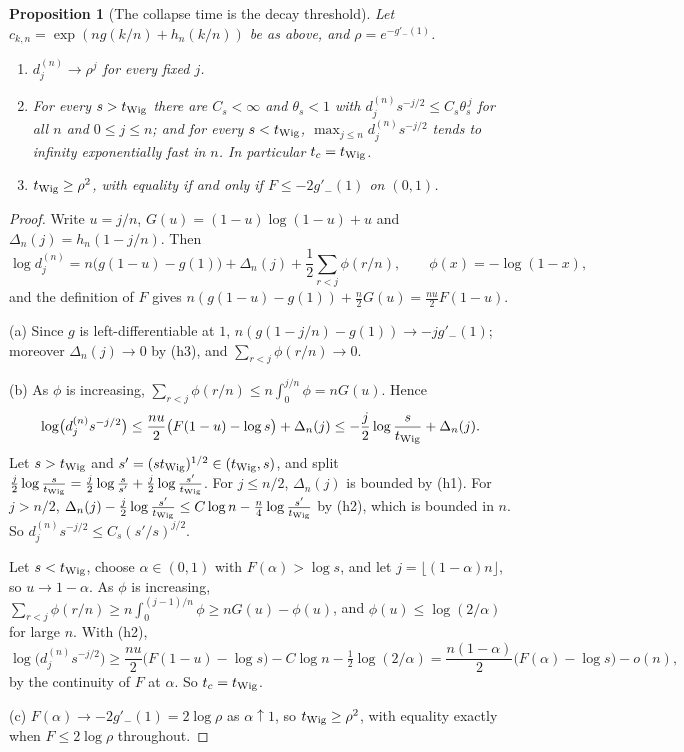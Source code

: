 \documentclass[11pt]{amsart}
\newtheorem{proposition}[theorem]{Proposition}
\theoremstyle{definition}
\theoremstyle{remark}
\numberwithin{equation}{section}
\begin{document}
\begin{proposition}[The collapse time is the decay threshold]\label{prop:profile-decay}
Let $c_{k,n}=\exp(ng(k/n)+h_n(k/n))$ be as above, and $\rho=e^{-g'_-(1)}$.
\begin{enumerate}
\item[(a)] $d^{(n)}_j\to\rho^j$ for every fixed $j$.
\item[(b)] For every $s>t_{\rm Wig}$ there are $C_s<\infty$ and $\theta_s<1$ with $d^{(n)}_js^{-j/2}\le C_s\theta_s^{\,j}$ for all $n$ and $0\le j\le n$; and for every $s<t_{\rm Wig}$, $\max_{j\le n}d^{(n)}_js^{-j/2}$ tends to infinity exponentially fast in $n$. In particular $t_c=t_{\rm Wig}$.
\item[(c)] $t_{\rm Wig}\ge\rho^2$, with equality if and only if $F\le-2g'_-(1)$ on $(0,1)$.
\end{enumerate}
\end{proposition}

\begin{proof}
Write $u=j/n$, $G(u)=(1-u)\log(1-u)+u$ and $\Delta_n(j)=h_n(1-j/n)$. Then
\[
\log d^{(n)}_j=n\bigl(g(1-u)-g(1)\bigr)+\Delta_n(j)+\frac12\sum_{r<j}\phi(r/n),\qquad\phi(x)=-\log(1-x),
\]
and the definition of $F$ gives $n(g(1-u)-g(1))+\frac n2G(u)=\frac{nu}2F(1-u)$.

(a) Since $g$ is left-differentiable at $1$, $n(g(1-j/n)-g(1))\to-jg'_-(1)$; moreover $\Delta_n(j)\to0$ by (h3), and $\sum_{r<j}\phi(r/n)\to0$.

(b) As $\phi$ is increasing, $\sum_{r<j}\phi(r/n)\le n\int_0^{j/n}\phi=nG(u)$. Hence
\[
\log\bigl(d^{(n)}_js^{-j/2}\bigr)\le\frac{nu}2\bigl(F(1-u)-\log s\bigr)+\Delta_n(j)\le-\frac j2\log\frac s{t_{\rm Wig}}+\Delta_n(j).
\]
Let $s>t_{\rm Wig}$ and $s'=(st_{\rm Wig})^{1/2}\in(t_{\rm Wig},s)$, and split $\frac j2\log\frac s{t_{\rm Wig}}=\frac j2\log\frac s{s'}+\frac j2\log\frac{s'}{t_{\rm Wig}}$. For $j\le n/2$, $\Delta_n(j)$ is bounded by (h1). For $j>n/2$, $\Delta_n(j)-\frac j2\log\frac{s'}{t_{\rm Wig}}\le C\log n-\frac n4\log\frac{s'}{t_{\rm Wig}}$ by (h2), which is bounded in $n$. So $d^{(n)}_js^{-j/2}\le C_s(s'/s)^{j/2}$.

Let $s<t_{\rm Wig}$, choose $\alpha\in(0,1)$ with $F(\alpha)>\log s$, and let $j=\lfloor(1-\alpha)n\rfloor$, so $u\to1-\alpha$. As $\phi$ is increasing, $\sum_{r<j}\phi(r/n)\ge n\int_0^{(j-1)/n}\phi\ge nG(u)-\phi(u)$, and $\phi(u)\le\log(2/\alpha)$ for large $n$. With (h2),
\[
\log\bigl(d^{(n)}_js^{-j/2}\bigr)\ge\frac{nu}2\bigl(F(1-u)-\log s\bigr)-C\log n-\tfrac12\log(2/\alpha)=\frac{n(1-\alpha)}2\bigl(F(\alpha)-\log s\bigr)-o(n),
\]
by the continuity of $F$ at $\alpha$. So $t_c=t_{\rm Wig}$.

(c) $F(\alpha)\to-2g'_-(1)=2\log\rho$ as $\alpha\uparrow1$, so $t_{\rm Wig}\ge\rho^2$, with equality exactly when $F\le2\log\rho$ throughout.
\end{proof}
\end{document}
